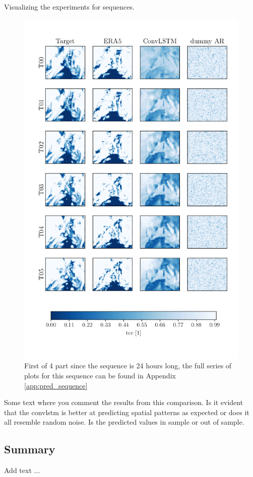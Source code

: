 Visualizing the experiments for sequences.
\begin{figure}[ht]
    \centering
    \includegraphics[sale=0.1]{python_figs/comparting_seq_part_1_of4.png}
    \caption{First of 4 part since the sequence is 24 hours long, the full series of plots for this sequence can be found in Appendix \ref{app:pred_sequence} }
    \label{fig:target_predict_era5_horizontal}
\end{figure}

Some text where you comment the results from this comparison. Is it evident that the \acrshort{convlstm} is better at predicting spatial patterns as expected or does it all resemble random noise. Is the predicted values in sample or out of sample.


\subsection{Summary} \label{sec:summary_num}
Add text ... 

\clearpage

